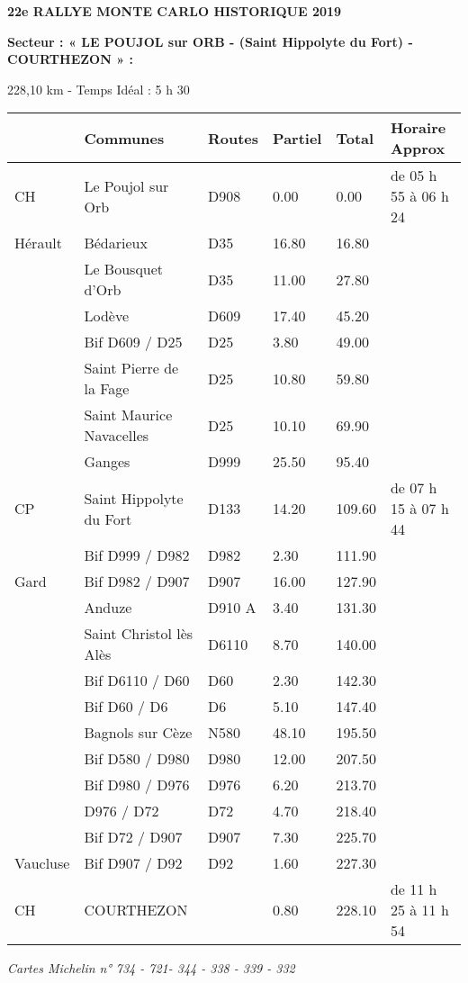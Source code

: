 \documentclass{article}%
\begin{document}
%
\normalsize%
\begin{center} \textbf{\LARGE{22e RALLYE MONTE CARLO HISTORIQUE 2019}} \end{center}%
\begin{flushleft} \textbf{Secteur : « LE POUJOL sur ORB - (Saint Hippolyte du Fort) - COURTHEZON » :
} \end{flushleft}%
\begin{flushright} 228,10 km - Temps Idéal : 5 h 30 \end{flushright}%
\begin{longtable}{p{2.25cm}|p{7.0cm}|p{1.5cm}|p{1.5cm}|p{1.5cm}|p{3.5cm}}%
\hline%
&Communes&Routes&Partiel&Total&Horaire Approx\\%
\hline%
\endhead%
\endfoot%
\endlastfoot%
﻿CH &Le Poujol sur Orb&D908&0.00&0.00&de 05 h 55 à 06 h 24\\%
Hérault&Bédarieux&D35&16.80&16.80&\\%
&Le Bousquet d'Orb&D35&11.00&27.80&\\%
&Lodève&D609&17.40&45.20&\\%
&Bif D609 / D25&D25&3.80&49.00&\\%
&Saint Pierre de la Fage &D25&10.80&59.80&\\%
&Saint Maurice Navacelles &D25&10.10&69.90&\\%
&Ganges&D999&25.50&95.40&\\%
CP&Saint Hippolyte du Fort&D133&14.20&109.60&de 07 h 15 à 07 h 44\\%
&Bif D999 / D982&D982&2.30&111.90&\\%
Gard&Bif D982 / D907&D907&16.00&127.90&\\%
&Anduze&D910 A&3.40&131.30&\\%
&Saint Christol lès Alès&D6110&8.70&140.00&\\%
&Bif D6110 / D60&D60 &2.30&142.30&\\%
&Bif D60 / D6&D6&5.10&147.40&\\%
&Bagnols sur Cèze&N580&48.10&195.50&\\%
&Bif D580 / D980&D980&12.00&207.50&\\%
&Bif D980 / D976&D976&6.20&213.70&\\%
&D976 / D72&D72&4.70&218.40&\\%
&Bif D72 / D907&D907&7.30&225.70&\\%
Vaucluse&Bif D907 / D92&D92&1.60&227.30&\\%
      CH&COURTHEZON&&0.80&228.10&de 11 h 25 à 11 h 54\\%
\hline%
\end{longtable}%
\begin{flushleft} \textit{Cartes Michelin n° 734 - 721- 344 - 338 - 339 - 332
} \end{flushleft}%
\end{document}
